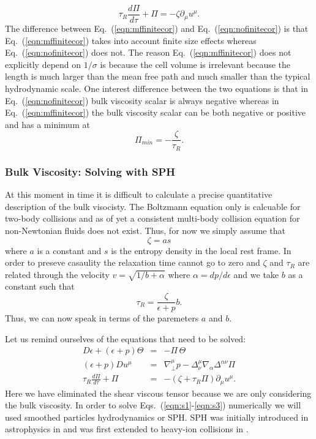 \documentclass[aps,article]{revtex4}
\begin{document}
\begin{equation}\label{eqn:nofinitecor}
\tau_R\frac{d\Pi}{d\tau}+\Pi=-\zeta\partial_{\mu}u^{\mu}.
\end{equation}
The difference between Eq.\ (\ref{eqn:mffinitecor}) and Eq.\ (\ref{eqn:nofinitecor}) is that Eq.\ (\ref{eqn:mffinitecor}) takes into account finite size effects whereas Eq.\ (\ref{eqn:nofinitecor}) does not.  The reason Eq.\ (\ref{eqn:mffinitecor})  does not explicitly depend on $1/\sigma$ is because the cell volume is irrelevant because the length is much larger than the mean free path and much smaller than the typical hydrodynamic scale. One interest difference between the two equations is that in Eq.\ (\ref{eqn:nofinitecor}) bulk viscosity scalar is always negative whereas in Eq.\ (\ref{eqn:mffinitecor}) the bulk viscosity scalar can be both negative or positive and has a minimum at
\begin{equation}
\Pi_{min}=-\frac{\zeta}{\tau_R}.
\end{equation}

\subsubsection{Bulk Viscosity: Solving with SPH}
At this moment in time it is difficult to calculate a precise quantitative description of the bulk visocisty.  The Boltzmann equation only is calcuable for two-body collisions and as of yet a consistent multi-body collision equation for non-Newtonian fluids does not exist.  Thus, for now we simply assume that
\begin{equation}
\zeta=as
\end{equation}
where $a$ is a constant and $s$ is the entropy density in the local rest frame.  In order to preseve casaulity the relaxation time cannot go to zero and $\zeta$ and $\tau_R$ are related through the velocity $v=\sqrt{1/b+\alpha}$ where $\alpha=dp/d\epsilon$ and we take $b$ as a constant such that
\begin{equation}
\tau_R=\frac{\zeta}{\epsilon+p}b.
\end{equation}
Thus, we can now speak in terms of the paremeters $a$ and $b$. 

Let us remind ourselves of the equations that need to be solved:
\begin{eqnarray}
D\epsilon+\left(\epsilon+p\right)\Theta&=&-\Pi\,\Theta\label{eqn:s1}\\
\left(\epsilon+p\right) D u^{\mu}&=&\nabla^{\mu}_{\perp}p-\Delta^{\mu}_{\nu}\nabla_{\alpha}\Delta^{\alpha\nu}\Pi\label{eqn:s2}\\
\tau_R\frac{d\Pi}{d\tau}+\Pi&=&-\left(\zeta+\tau_R\Pi\right)\partial_{\mu}u^{\mu}.\label{eqn:s3}
\end{eqnarray}
Here we have eliminated the shear viscous tensor because we are only considering the bulk viscosity.  In order to solve Eqs.\ (\ref{eqn:s1}-\ref{eqn:s3}) numerically we will used smoothed particles hydrodynamics or SPH.  SPH was initially introduced in astrophysics in \cite{astroSPH} and was first extended to heavy-ion collisions in \cite{SPHheavyion}.
\end{document}
